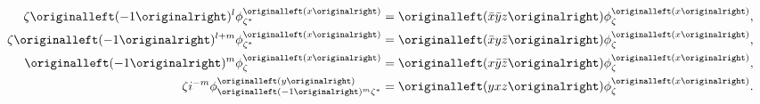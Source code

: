 \begin{align}
  \zeta\left(-1\right)^{l}
  \phi_{ \zeta^{*} }^{\left(x\right)}
  & =
      \left(\bar{x}\bar{y}z\right)
      \phi_{ \zeta }^{\left(x\right)},
\label{dblinv:z-state:x}
\\
  \zeta\left(-1\right)^{l+m}
  \phi_{ \zeta^{*} }^{\left(x\right)}
  & =
      \left(\bar{x}y\bar{z}\right)
      \phi_{ \zeta }^{\left(x\right)},
\label{dblinv:y-state:x}
\\
  \left(-1\right)^{m}
  \phi_{ \zeta }^{\left(x\right)}
  & =
      \left(x\bar{y}\bar{z}\right)
      \phi_{ \zeta }^{\left(x\right)},
\label{dblinv:x-state:x}
\\
  \zeta\im^{-m}
  \phi_{ \left(-1\right)^{m}\zeta^{*} }^{\left(y\right)}
  & =
  \left(yxz\right)
  \phi_{ \zeta }^{\left(x\right)}.
\label{acyc:z-state:x}
\end{align}